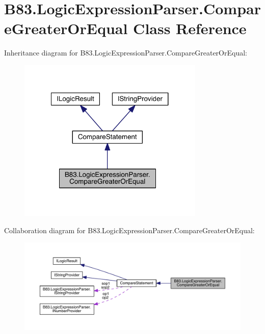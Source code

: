 \hypertarget{class_b83_1_1_logic_expression_parser_1_1_compare_greater_or_equal}{}\section{B83.\+Logic\+Expression\+Parser.\+Compare\+Greater\+Or\+Equal Class Reference}
\label{class_b83_1_1_logic_expression_parser_1_1_compare_greater_or_equal}


Inheritance diagram for B83.\+Logic\+Expression\+Parser.\+Compare\+Greater\+Or\+Equal\+:\nopagebreak
\begin{figure}[H]
\begin{center}
\leavevmode
\includegraphics[width=251pt]{class_b83_1_1_logic_expression_parser_1_1_compare_greater_or_equal__inherit__graph}
\end{center}
\end{figure}


Collaboration diagram for B83.\+Logic\+Expression\+Parser.\+Compare\+Greater\+Or\+Equal\+:\nopagebreak
\begin{figure}[H]
\begin{center}
\leavevmode
\includegraphics[width=350pt]{class_b83_1_1_logic_expression_parser_1_1_compare_greater_or_equal__coll__graph}
\end{center}
\end{figure}
